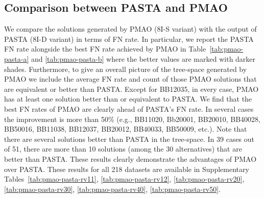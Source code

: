 \subsection{Comparison between PASTA and PMAO}
We compare the solutions generated by PMAO (8I-S variant) with the output of PASTA (8I-D variant) in terms of FN rate. In particular, we report the PASTA FN rate  alongside the best FN rate achieved by PMAO in Table~\ref{tab:pmao-pasta-a} and \ref{tab:pmao-pasta-b} where the better values are marked with darker shades. Furthermore, to give an overall picture of the tree-space generated by PMAO we include the average FN rate and count of those PMAO solutions that are equivalent or better than PASTA. Except for BB12035, in every case, PMAO has at least one solution better than or equivalent to PASTA. We find that the best FN rates of PMAO are clearly ahead of PASTA's FN rate. In several cases the improvement is more than 50\% (e.g., BB11020, Bb20001, BB20010, BB40028, BB50016, BB11038, BB12037, BB20012, BB40033, BB50009, etc.). Note that there are several solutions better than PASTA in the tree-space. In 39 cases out of 51, there are more than 10 solutions (among the 30 alternatives) that are better than PASTA. These results clearly demonstrate the advantages of PMAO over PASTA. These results for all 218 datasets are available in Supplementary Tables~\ref{tab:pmao-pasta-rv11}, \ref{tab:pmao-pasta-rv12}, \ref{tab:pmao-pasta-rv20}, \ref{tab:pmao-pasta-rv30}, \ref{tab:pmao-pasta-rv40}, \ref{tab:pmao-pasta-rv50}.
